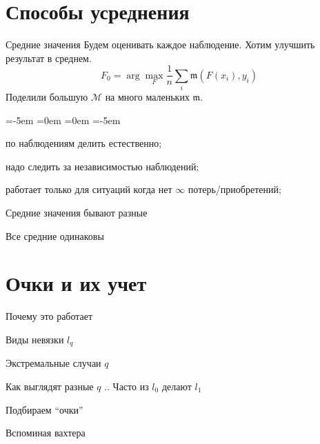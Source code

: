 \documentclass[14pt, fleqn, xcolor={dvipsnames, table}]{beamer}
\begin{document}
\section{Способы усреднения}

\begin{frame}{Средние значения}
Будем оценивать каждое наблюдение. Хотим улучшить результат в среднем.
$$
F_0 = \arg \max_F \frac{1}{n} \sum_i \mathfrak{m}(F(x_i),y_i)
$$
Поделили большую $\mathcal{M}$ на много маленьких $\mathfrak{m}$. 
\begin{description}
\small
\leftmargin=-5em
\itemindent=0em
=0em
\leftskip=-5em
  \item[\color{green}+] по наблюдениям делить естественно;
  \item[\color{red}---] надо следить за независимостью наблюдений;
  \item[\color{red}---] работает только для ситуаций когда нет $\infty$ потерь/приобретений;
\end{description} 
\end{frame}

\begin{frame}{Средние значения бывают разные}
\end{frame}

\begin{frame}{Все средние одинаковы}
\end{frame}

\section{Очки и их учет}

\begin{frame}{Почему это работает}
\end{frame}

\begin{frame}{Виды невязки $l_q$}
\end{frame}

\begin{frame}{Экстремальные случаи $q$}
\end{frame}

\begin{frame}{Как выглядят разные $q$}
..
Часто из $l_0$ делают $l_1$
\end{frame}

\begin{frame}{Подбираем ``очки''} %
\end{frame}

\begin{frame}{Вспоминая вахтера}
\end{frame}
\end{document}

